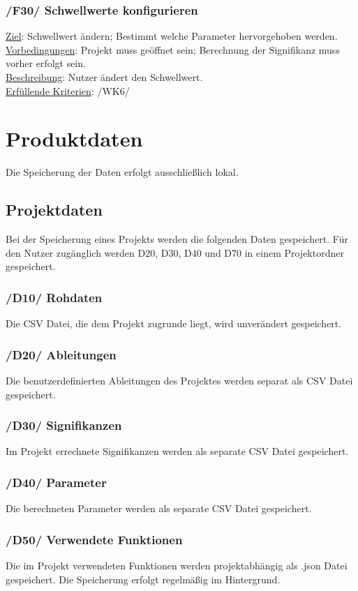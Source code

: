 \documentclass{article}
\begin{document}
\subsubsection*{/F30/ Schwellwerte konfigurieren}
\underline{Ziel}: Schwellwert ändern; Bestimmt welche Parameter hervorgehoben werden. \\
\underline{Vorbedingungen}: Projekt muss geöffnet sein; Berechnung der Signifikanz muss vorher erfolgt sein. \\
\underline{Beschreibung}: Nutzer ändert den Schwellwert.\\
\underline{Erfüllende Kriterien}: /WK6/

\clearpage
\section{Produktdaten}
Die Speicherung der Daten erfolgt ausschließlich lokal.
\subsection{Projektdaten}
Bei der Speicherung eines Projekts werden die folgenden Daten gespeichert. Für den Nutzer zugänglich werden D20, D30, D40 und D70 in einem Projektordner gespeichert.
\subsubsection*{/D10/ Rohdaten}
Die CSV Datei, die dem Projekt zugrunde liegt, wird unverändert gespeichert.
\subsubsection*{/D20/ Ableitungen}
Die benutzerdefinierten Ableitungen des Projektes werden separat als CSV Datei gespeichert.
\subsubsection*{/D30/ Signifikanzen}
Im Projekt errechnete Signifikanzen werden als separate CSV Datei gespeichert.
\subsubsection*{/D40/ Parameter}
Die berechneten Parameter werden als separate CSV Datei gespeichert.
\subsubsection*{/D50/ Verwendete Funktionen}
Die im Projekt verwendeten Funktionen werden projektabhängig als .json  Datei gespeichert. Die Speicherung erfolgt regelmäßig im Hintergrund.
\end{document}
